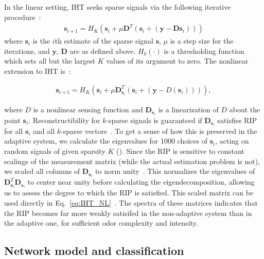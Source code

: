 \documentclass[9pt,lineno]{elife}
\begin{document}
In the linear setting, IHT seeks sparse signals via the following iterative procedure~\citep{IHT}:
\begin{align}
\mathbf{s}_{i + 1} = H_K(\mathbf{s}_i + \mu\mathbf{D}^T(\mathbf {s}_i + (\mathbf y - \mathbf D\mathbf {s}_i)))
\label{eq:IHT}
\end{align}
where $\mathbf{s}_i$ is the $i$th estimate of the sparse signal $\mathbf{s}$, $\mu$ is a step size for the iterations, and $\mathbf y$, $\mathbf D$ are as defined above. $H_k(\cdot)$ is a thresholding function which sets all but the largest $K$ values of its argument to zero. The nonlinear extension to IHT is~\citep{nonlin_CS}:

\begin{align}
\mathbf{s}_{i + 1} = H_K(\mathbf{s}_i + \mu\mathbf{D}_{\mathbf s_i}^T(\mathbf {s}_i + (\mathbf y - D(\mathbf {s}_i)))),
\label{eq:IHT_NL}
\end{align}

where $D$ is a nonlinear sensing function and $\mathbf{D}_{\mathbf s_i}$ is a linearization of $D$ about the point $\mathbf s_i$. Reconstructibility for $k$-sparse signals is guaranteed if $\mathbf{D}_{\mathbf s_i}$ satisfies RIP for all $\mathbf s_i$ and all $k$-sparse vectors~\citep{IHT}. To get a sense of how this is preserved in the adaptive system, we calculate the eigenvalues for 1000 choices of $\mathbf s_i$, acting on random signals of given sparsity $K$ (). Since the RIP is sensitive to constant scalings of the measurement matrix (while the actual estimation problem is not), we scaled all columns of $\mathbf{D}_{\mathbf s_i}$ to norm unity~\citep{using_IHT}. This normalizes the eigenvalues of $\mathbf{D}^T_{\mathbf s_i}\mathbf{D}_{\mathbf s_i}$ to center near unity before calculating the eigendecomposition, allowing us to assess the degree to which the RIP is satisfied. This scaled matrix can be used directly in Eq.~\ref{eq:IHT_NL}~\citep{nonlin_CS,using_IHT}. The spectra of these matrices indicates that the RIP becomes far more weakly satisifed in the non-adaptive system than in the adaptive one, for sufficient odor complexity and intensity. \\

\subsection{Network model and classification} 
\end{document}
